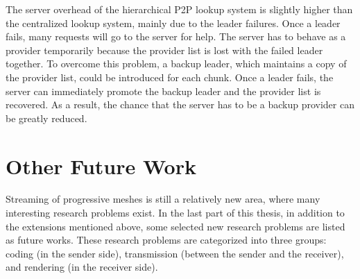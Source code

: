 The server overhead of the hierarchical P2P lookup system is slightly higher than the centralized lookup system, 
mainly due to the leader failures. Once a leader fails, many requests will go to the server for help. 
The server has to behave as a provider temporarily because the provider list is lost with the failed leader together. 
To overcome this problem, a backup leader, which maintains a copy of the provider list, 
could be introduced for each chunk. 
Once a leader fails, the server can immediately promote the backup leader 
and the provider list is recovered. 
As a result, the chance that the server has to be a backup provider can be greatly reduced.


\section{Other Future Work}
Streaming of progressive meshes is still a relatively new area, where many interesting research problems exist.
In the last part of this thesis, in addition to the extensions mentioned above,
some selected new research problems are listed as future works.
These research problems are categorized into three groups: coding (in the sender side), 
transmission (between the sender and the receiver), and rendering (in the receiver side).
